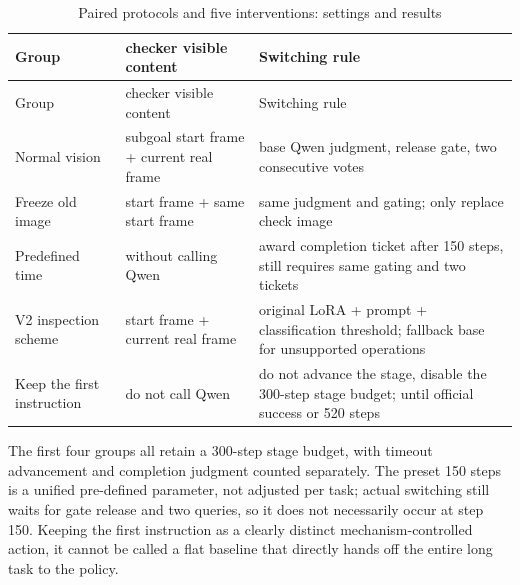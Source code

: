 \FloatBarrier\begingroup\small\setlength{\tabcolsep}{2.5pt}
\begin{longtable}[]{@{}
  >{\raggedright\arraybackslash}p{}
  >{\raggedright\arraybackslash}p{}
  >{\raggedright\arraybackslash}p{}@{}}
\caption{Paired protocols and five interventions: settings and results}\label{tab:s12-3}\tabularnewline
\toprule\noalign{}
\begin{minipage}[b]{\linewidth}\raggedright
Group
\end{minipage} & \begin{minipage}[b]{\linewidth}\raggedright
checker visible content
\end{minipage} & \begin{minipage}[b]{\linewidth}\raggedright
Switching rule
\end{minipage} \\
\midrule\noalign{}
\endfirsthead
\toprule\noalign{}
\begin{minipage}[b]{\linewidth}\raggedright
Group
\end{minipage} & \begin{minipage}[b]{\linewidth}\raggedright
checker visible content
\end{minipage} & \begin{minipage}[b]{\linewidth}\raggedright
Switching rule
\end{minipage} \\
\midrule\noalign{}
\endhead
\bottomrule\noalign{}
\endlastfoot
Normal vision & subgoal start frame + current real frame & base Qwen judgment, release gate, two consecutive votes \\
Freeze old image & start frame + same start frame & same judgment and gating; only replace check image \\
Predefined time & without calling Qwen & award completion ticket after 150 steps, still requires same gating and two tickets \\
V2 inspection scheme & start frame + current real frame & original LoRA + prompt + classification threshold; fallback base for unsupported operations \\
Keep the first instruction & do not call Qwen & do not advance the stage, disable the 300-step stage budget; until official success or 520 steps \\
\end{longtable}\endgroup

The first four groups all retain a 300-step stage budget, with timeout advancement and completion judgment counted separately. The preset 150 steps is a unified pre-defined parameter, not adjusted per task; actual switching still waits for gate release and two queries, so it does not necessarily occur at step 150. Keeping the first instruction as a clearly distinct mechanism-controlled action, it cannot be called a flat baseline that directly hands off the entire long task to the policy.

